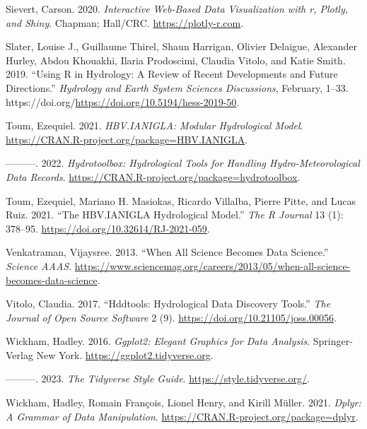 \begin{CSLReferences}{1}{0}
\leavevmode{}%
Sievert, Carson. 2020. \emph{Interactive Web-Based Data Visualization with r, Plotly, and Shiny}. Chapman; Hall/CRC. \url{https://plotly-r.com}.

\leavevmode{}%
Slater, Louise J., Guillaume Thirel, Shaun Harrigan, Olivier Delaigue, Alexander Hurley, Abdou Khouakhi, Ilaria Prodoscimi, Claudia Vitolo, and Katie Smith. 2019. {``Using {R} in Hydrology: A Review of Recent Developments and Future Directions.''} \emph{Hydrology and Earth System Sciences Discussions}, February, 1--33. https://doi.org/\url{https://doi.org/10.5194/hess-2019-50}.

\leavevmode{}%
Toum, Ezequiel. 2021. \emph{{HBV.IANIGLA}: Modular Hydrological Model}. \url{https://CRAN.R-project.org/package=HBV.IANIGLA}.

\leavevmode{}%
---------. 2022. \emph{Hydrotoolbox: Hydrological Tools for Handling Hydro-Meteorological Data Records}. \url{https://CRAN.R-project.org/package=hydrotoolbox}.

\leavevmode{}%
Toum, Ezequiel, Mariano H. Masiokas, Ricardo Villalba, Pierre Pitte, and Lucas Ruiz. 2021. {``{The HBV.IANIGLA Hydrological Model}.''} \emph{{The R Journal}} 13 (1): 378--95. \url{https://doi.org/10.32614/RJ-2021-059}.

\leavevmode{}%
Venkatraman, Vijaysree. 2013. {``When {All} {Science} {Becomes} {Data} {Science}.''} \emph{Science {\textbar} AAAS}. \url{https://www.sciencemag.org/careers/2013/05/when-all-science-becomes-data-science}.

\leavevmode{}%
Vitolo, Claudia. 2017. {``Hddtools: Hydrological Data Discovery Tools.''} \emph{The Journal of Open Source Software} 2 (9). \url{https://doi.org/10.21105/joss.00056}.

\leavevmode{}%
Wickham, Hadley. 2016. \emph{Ggplot2: Elegant Graphics for Data Analysis}. Springer-Verlag New York. \url{https://ggplot2.tidyverse.org}.

\leavevmode{}%
---------. 2023. \emph{The Tidyverse Style Guide}. \url{https://style.tidyverse.org/}.

\leavevmode{}%
Wickham, Hadley, Romain François, Lionel Henry, and Kirill Müller. 2021. \emph{Dplyr: A Grammar of Data Manipulation}. \url{https://CRAN.R-project.org/package=dplyr}.


\end{CSLReferences}
